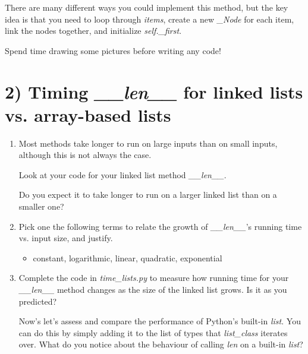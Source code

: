\documentclass[12pt]{article}
\begin{document}
\begin{enumerate}[1.]
    \bigskip

    There are many different ways you could implement this method, but the key idea
    is that you need to loop through \textit{items}, create a new \textit{\_Node} for each
    item, link the nodes together, and initialize \textit{self.\_first}.

    \bigskip

    Spend time drawing some pictures before writing any code!

\end{enumerate}

\section*{2) Timing \textit{\_\_len\_\_} for linked lists vs. array-based lists}

\begin{enumerate}[1.]
    \item Most methods take longer to run on large inputs than on small inputs,
    although this is not always the case.

    \bigskip

    Look at your code for your linked list method \textit{\_\_len\_\_}.

    Do you expect it to take longer to run on a larger
    linked list than on a smaller one?

    \item Pick one the following terms to relate the growth of \textit{\_\_len\_\_}'s
    running time vs. input size, and justify.
    \begin{itemize}
        \item constant, logarithmic, linear, quadratic, exponential
    \end{itemize}

    \item Complete the code in \textit{time\_lists.py} to measure how running
    time for your \textit{\_\_len\_\_} method changes as the size of the linked
    list grows. Is it as you predicted?

    \bigskip

    Now’s let’s assess and compare the performance of Python’s built-in \textit{list}.
    You can do this by simply adding it to the list of types that \textit{list\_class}
    iterates over. What do you notice about the behaviour of calling \textit{len} on
    a built-in \textit{list}?

\end{enumerate}
\end{document}
